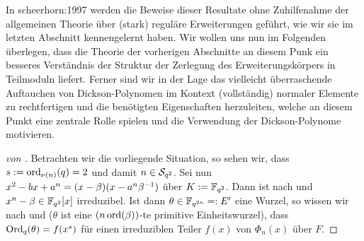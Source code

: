 In \autocite{scheerhorn:1996}{scheerhorn:1997} werden die Beweise dieser
Resultate ohne Zuhilfenahme der allgemeinen Theorie über (stark) reguläre
Erweiterungen geführt, wie wir sie im letzten Abschnitt kennengelernt haben.
Wir wollen uns nun im Folgenden überlegen, dass die Theorie der vorherigen
Abschnitte an diesem Punk ein besseres Verständnis der Struktur der Zerlegung 
des Erweiterungskörpers in Teilmoduln liefert. Ferner sind wir in der Lage
das vielleicht überraschende Auftauchen von Dickson-Polynomen im Kontext
(vollständig) normaler Elemente zu rechtfertigen und die benötigten 
Eigenschaften herzuleiten, welche an diesem Punkt eine zentrale Rolle spielen
und die Verwendung der Dickson-Polynome motivieren.

\begin{proof}[von ]
  Betrachten wir die vorliegende Situation, so sehen wir, dass
  $s := \ord_{\nu(n)}(q) = 2$ und damit $n \in \S_{q^2}$.
  Sei nun 
  $x^2-bx+a^n = (x -\beta)(x -a^n\beta\inv)$ über $K := \F_{q^2}$.
  Dann ist 
  nach  und  
  $x^n-\beta \in \F_{q^2}[x]$ irreduzibel.
  Ist dann $\theta \in \F_{q^{2n}} =: E'$ eine Wurzel, so wissen wir nach
   und 
  ($\theta$ ist eine $(n\ord(\beta))$-te primitive Einheitswurzel), dass
  $\Ord_q(\theta) = f(x^s)$ für einen irreduziblen Teiler $f(x)$ von
  $\Phi_n(x)$ über $F$. 
  

\end{proof}
